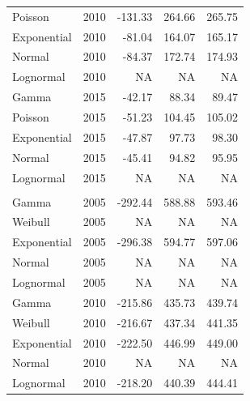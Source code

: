 \documentclass[
11pt, %
oneside, %
english, %
singlespacing, %
]{macthesis} %
\begin{document}
\begin{table}
\begin{tabular}[t]{llrrr}
\hspace{1em}Poisson & 2010 & -131.33 & 264.66 & 265.75\\
\hspace{1em}Exponential & 2010 & -81.04 & 164.07 & 165.17\\
\hspace{1em}Normal & 2010 & -84.37 & 172.74 & 174.93\\
\hspace{1em}Lognormal & 2010 & NA & NA & NA\\
\hspace{1em}Gamma & 2015 & -42.17 & 88.34 & 89.47\\
\hspace{1em}Poisson & 2015 & -51.23 & 104.45 & 105.02\\
\hspace{1em}Exponential & 2015 & -47.87 & 97.73 & 98.30\\
\hspace{1em}Normal & 2015 & -45.41 & 94.82 & 95.95\\
\hspace{1em}Lognormal & 2015 & NA & NA & NA\\
\addlinespace[0.3em]
\multicolumn{5}{l}{\textbf{Destination: work or school}}\\
\hspace{1em}Gamma & 2005 & -292.44 & 588.88 & 593.46\\
\hspace{1em}Weibull & 2005 & NA & NA & NA\\
\hspace{1em}Exponential & 2005 & -296.38 & 594.77 & 597.06\\
\hspace{1em}Normal & 2005 & NA & NA & NA\\
\hspace{1em}Lognormal & 2005 & NA & NA & NA\\
\hspace{1em}Gamma & 2010 & -215.86 & 435.73 & 439.74\\
\hspace{1em}Weibull & 2010 & -216.67 & 437.34 & 441.35\\
\hspace{1em}Exponential & 2010 & -222.50 & 446.99 & 449.00\\
\hspace{1em}Normal & 2010 & NA & NA & NA\\
\hspace{1em}Lognormal & 2010 & -218.20 & 440.39 & 444.41\\

\end{tabular}
\end{table}
\end{document}
